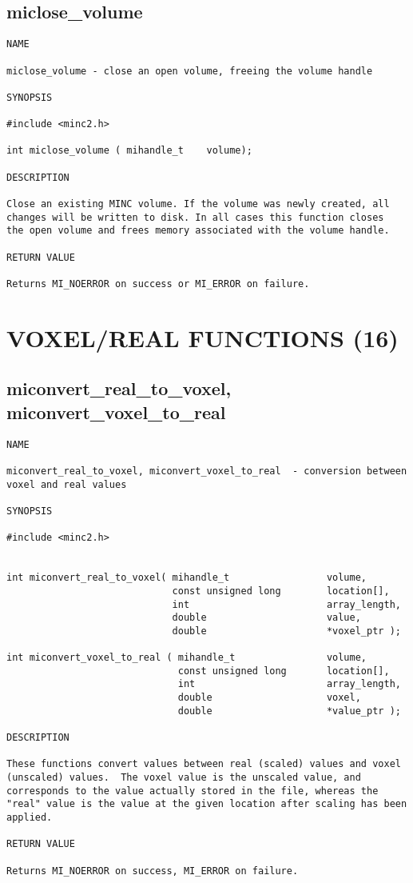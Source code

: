 \documentclass{article}
\begin{document}
\subsection{miclose\_volume}
\begin{verbatim}
NAME

miclose_volume - close an open volume, freeing the volume handle

SYNOPSIS

#include <minc2.h>

int miclose_volume ( mihandle_t    volume);

DESCRIPTION

Close an existing MINC volume. If the volume was newly created, all
changes will be written to disk. In all cases this function closes
the open volume and frees memory associated with the volume handle.

RETURN VALUE

Returns MI_NOERROR on success or MI_ERROR on failure.
\end{verbatim}

\section{VOXEL/REAL FUNCTIONS (16)}
\subsection{miconvert\_real\_to\_voxel, miconvert\_voxel\_to\_real}
\begin{verbatim}
NAME 

miconvert_real_to_voxel, miconvert_voxel_to_real  - conversion between
voxel and real values

SYNOPSIS

#include <minc2.h>


int miconvert_real_to_voxel( mihandle_t                 volume,
                             const unsigned long        location[],
                             int                        array_length,
                             double                     value,
                             double                     *voxel_ptr );

int miconvert_voxel_to_real ( mihandle_t                volume, 
                              const unsigned long       location[],
                              int                       array_length,
                              double                    voxel,
                              double                    *value_ptr );

DESCRIPTION

These functions convert values between real (scaled) values and voxel
(unscaled) values.  The voxel value is the unscaled value, and
corresponds to the value actually stored in the file, whereas the
"real" value is the value at the given location after scaling has been
applied.

RETURN VALUE

Returns MI_NOERROR on success, MI_ERROR on failure.
\end{verbatim}
\end{document}
